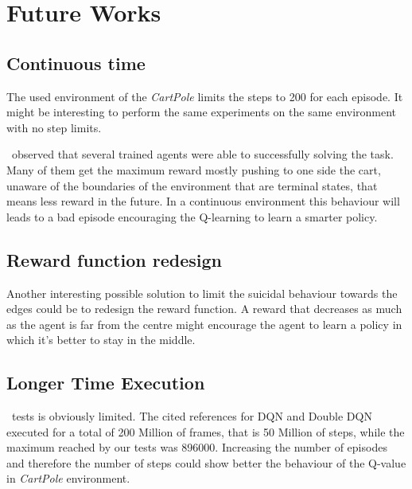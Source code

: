 
\section{Future Works}

\subsection{Continuous time}

The used environment of the \textit{CartPole} limits the steps to 200 for each episode. It might be interesting to perform the same experiments on the same environment with no step limits.

\Auth~observed that several trained agents were able to successfully solving the task. Many of them get the maximum reward mostly pushing to one side the cart, unaware of the boundaries of the environment that are terminal states, that means less reward in the future. In a continuous environment this behaviour will leads to a bad episode encouraging the Q-learning to learn a smarter policy.

\subsection{Reward function redesign}

Another interesting possible solution to limit the suicidal behaviour towards the edges could be to redesign the reward function. A reward that decreases as much as the agent is far from the centre might encourage the agent to learn a policy in which it's better to stay in the middle.

\subsection{Longer Time Execution}

\Authpp~tests is obviously limited. The cited references for DQN and Double DQN executed for a total of 200 Million of frames, that is 50 Million of steps, while the maximum reached by our tests was 896000. Increasing the number of episodes and therefore the number of steps could show better the behaviour of the Q-value in \textit{CartPole} environment.